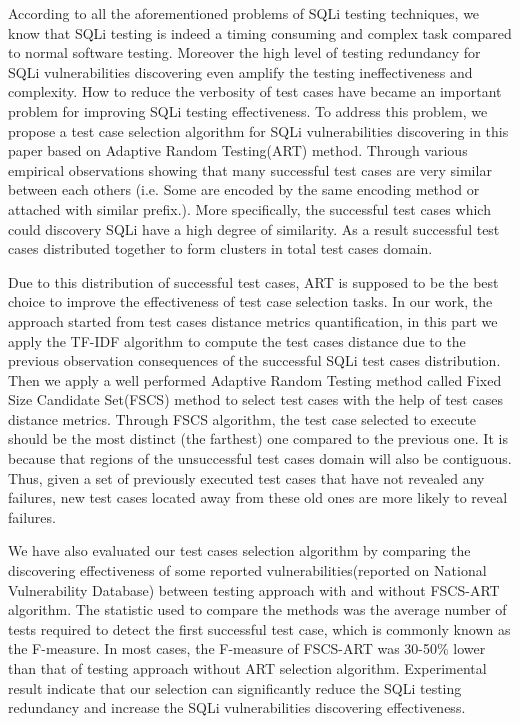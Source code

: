 \documentclass{sig-alternate}
\begin{document}
According to all the aforementioned problems of SQLi testing techniques, we know that SQLi testing is indeed a timing consuming and complex task compared to normal software testing. Moreover the high level of testing redundancy for SQLi vulnerabilities discovering even amplify the testing ineffectiveness and complexity. How to reduce the verbosity of test cases have became an important problem for improving SQLi testing effectiveness. To address this problem, we propose a test case selection algorithm for SQLi vulnerabilities discovering in this paper based on Adaptive Random Testing(ART) method. Through various empirical observations showing that many successful test cases are very similar between each others (i.e. Some are encoded by the same encoding method or attached with similar prefix.). More specifically, the successful test cases which could discovery SQLi have a high degree of similarity. As a result successful test cases distributed together to form clusters in total test cases domain. 

Due to this distribution of successful test cases, ART is supposed to be the best choice to improve the effectiveness of test case selection tasks. In our work, the approach started from test cases distance metrics quantification, in this part we apply the TF-IDF algorithm to compute the test cases distance due to the previous observation consequences of the successful SQLi test cases distribution. Then we apply a well performed Adaptive Random Testing method called Fixed Size Candidate Set(FSCS) method to select test cases with the help of test cases distance metrics. Through FSCS algorithm, the test case selected to execute should be the most distinct (the farthest) one compared to the previous one. It is because that regions of the unsuccessful test cases domain will also be contiguous. Thus, given a set of previously executed test cases that have not revealed any failures, new test cases located away from these old ones are more likely to reveal failures. 

We have also evaluated our test cases selection algorithm by comparing the discovering effectiveness of some reported vulnerabilities(reported on National Vulnerability Database) between testing approach with and without FSCS-ART algorithm. The statistic used to compare the methods was the average number of tests required to detect the first successful test case, which is commonly known as the F-measure\cite{chen2005adaptive}. In most cases, the F-measure of FSCS-ART was 30-50\% lower than that of testing approach without ART selection algorithm. Experimental result indicate that our selection can significantly reduce the SQLi testing redundancy and increase the SQLi vulnerabilities discovering effectiveness.
\end{document}
